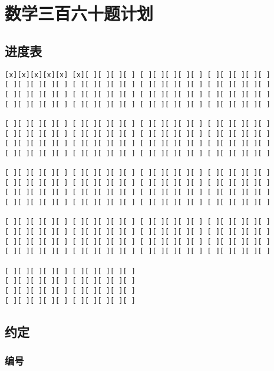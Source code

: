 \documentclass[12pt,a4paper,]{article}
\date{}
\begin{document}
\hypertarget{ux6570ux5b66ux4e09ux767eux516dux5341ux9898ux8ba1ux5212}{%
\section{数学三百六十题计划}\label{ux6570ux5b66ux4e09ux767eux516dux5341ux9898ux8ba1ux5212}}

\hypertarget{ux8fdbux5ea6ux8868}{%
\subsection{进度表}\label{ux8fdbux5ea6ux8868}}

\begin{verbatim}
[x][x][x][x][x] [x][ ][ ][ ][ ] [ ][ ][ ][ ][ ] [ ][ ][ ][ ][ ]
[ ][ ][ ][ ][ ] [ ][ ][ ][ ][ ] [ ][ ][ ][ ][ ] [ ][ ][ ][ ][ ]
[ ][ ][ ][ ][ ] [ ][ ][ ][ ][ ] [ ][ ][ ][ ][ ] [ ][ ][ ][ ][ ]
[ ][ ][ ][ ][ ] [ ][ ][ ][ ][ ] [ ][ ][ ][ ][ ] [ ][ ][ ][ ][ ]

[ ][ ][ ][ ][ ] [ ][ ][ ][ ][ ] [ ][ ][ ][ ][ ] [ ][ ][ ][ ][ ]
[ ][ ][ ][ ][ ] [ ][ ][ ][ ][ ] [ ][ ][ ][ ][ ] [ ][ ][ ][ ][ ]
[ ][ ][ ][ ][ ] [ ][ ][ ][ ][ ] [ ][ ][ ][ ][ ] [ ][ ][ ][ ][ ]
[ ][ ][ ][ ][ ] [ ][ ][ ][ ][ ] [ ][ ][ ][ ][ ] [ ][ ][ ][ ][ ]

[ ][ ][ ][ ][ ] [ ][ ][ ][ ][ ] [ ][ ][ ][ ][ ] [ ][ ][ ][ ][ ]
[ ][ ][ ][ ][ ] [ ][ ][ ][ ][ ] [ ][ ][ ][ ][ ] [ ][ ][ ][ ][ ]
[ ][ ][ ][ ][ ] [ ][ ][ ][ ][ ] [ ][ ][ ][ ][ ] [ ][ ][ ][ ][ ]
[ ][ ][ ][ ][ ] [ ][ ][ ][ ][ ] [ ][ ][ ][ ][ ] [ ][ ][ ][ ][ ]

[ ][ ][ ][ ][ ] [ ][ ][ ][ ][ ] [ ][ ][ ][ ][ ] [ ][ ][ ][ ][ ]
[ ][ ][ ][ ][ ] [ ][ ][ ][ ][ ] [ ][ ][ ][ ][ ] [ ][ ][ ][ ][ ]
[ ][ ][ ][ ][ ] [ ][ ][ ][ ][ ] [ ][ ][ ][ ][ ] [ ][ ][ ][ ][ ]
[ ][ ][ ][ ][ ] [ ][ ][ ][ ][ ] [ ][ ][ ][ ][ ] [ ][ ][ ][ ][ ]

[ ][ ][ ][ ][ ] [ ][ ][ ][ ][ ]
[ ][ ][ ][ ][ ] [ ][ ][ ][ ][ ]
[ ][ ][ ][ ][ ] [ ][ ][ ][ ][ ]
[ ][ ][ ][ ][ ] [ ][ ][ ][ ][ ]
\end{verbatim}

\hypertarget{ux7ea6ux5b9a}{%
\subsection{约定}\label{ux7ea6ux5b9a}}

\hypertarget{ux7f16ux53f7}{%
\subsubsection{编号}\label{ux7f16ux53f7}}
\end{document}
